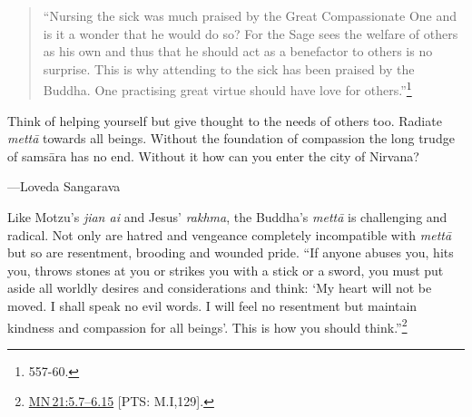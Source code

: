 \documentclass[10pt, openright]{book}
\newenvironment{epigram-2}%
{%
\vspace{1em}
\noindent
\quoting[leftmargin=2.5cm,rightmargin=2.5cm]%
\begin{itshape}
\large
}%
{\end{itshape}\endquoting
}%
\newenvironment{epigram-2-cite}%
{%
\quoting[leftmargin=2.5cm,rightmargin=2.5cm]%
\noindent\normal\hspace*{\fill} 
}%
{\endquoting\vspace{1em}
}%
\begin{document}
\begin{quote}


“Nursing the sick was much praised by the Great Compassionate One and is it a wonder that he would do so? For the Sage sees the welfare of others as his own and thus that he should act as a benefactor to others is no surprise. This is why attending to the sick has been praised by the Buddha. One practising great virtue should have love for others.”\footnote {\cite{Saddhammopāyana} 557-60.}




\end{quote}
\begin{epigram-2}
Think of helping yourself but give thought to the needs of others too. Radiate \textit{mettā} towards all beings. Without the foundation of compassion the long trudge of samsāra has no end. Without it how can you enter the city of Nirvana?
\end{epigram-2}

\begin{epigram-2-cite}
—Loveda Sangarava
\end{epigram-2-cite}

Like Motzu’s \textit{jian ai} and Jesus’ \textit{rakhma}, the Buddha’s \textit{mettā} is challenging and radical. Not only are hatred and vengeance completely incompatible with \textit{mettā} but so are resentment, brooding and wounded pride. “If anyone abuses you, hits you, throws stones at you or strikes you with a stick or a sword, you must put aside all worldly desires and considerations and think: ‘My heart will not be moved. I shall speak no evil words. I will feel no resentment but maintain kindness and compassion for all beings’. This is how you should think.”\footnote {\href{https://suttacentral.net/mn21/en/sujato\#5.7}{MN 21:5.7–6.15} [PTS: M.I,129].}
\end{document}
